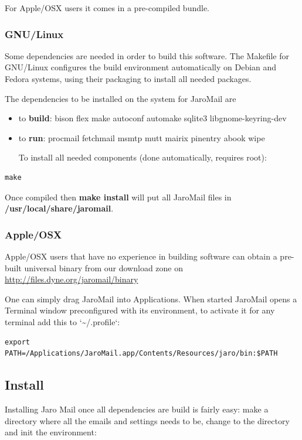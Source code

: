 \documentclass[a4,onecolumn,portrait]{article}
\begin{document}
For Apple/OSX users it comes in a pre-compiled bundle.

\subsubsection{GNU/Linux}
\label{sec-3-1-1}

Some dependencies are needed in order to build this software. The Makefile for GNU/Linux configures the build environment automatically on Debian and Fedora systems, using their packaging to install all needed packages.

The dependencies to be installed on the system for JaroMail are
\begin{itemize}
\item to \textbf{build}: bison flex make autoconf automake sqlite3 libgnome-keyring-dev
\item to \textbf{run}: procmail fetchmail msmtp mutt mairix pinentry abook wipe

To install all needed components (done automatically, requires root):
\end{itemize}

\begin{verbatim}
make
\end{verbatim}

Once compiled then \textbf{make install} will put all JaroMail files in \textbf{/usr/local/share/jaromail}.
\subsubsection{Apple/OSX}
\label{sec-3-1-2}

Apple/OSX users that have no experience in building software can obtain a pre-built universal binary from our download zone on \url{http://files.dyne.org/jaromail/binary}

One can simply drag JaroMail into Applications. When started JaroMail opens a Terminal window preconfigured with its environment, to activate it for any terminal add this to `\textasciitilde{}/.profile`:
\begin{verbatim}
export PATH=/Applications/JaroMail.app/Contents/Resources/jaro/bin:$PATH
\end{verbatim}
\subsection{Install}
\label{sec-3-2}

Installing Jaro Mail once all dependencies are build is fairly
easy: make a directory where all the emails and settings needs to be, change to the directory and init the environment:
\end{document}

